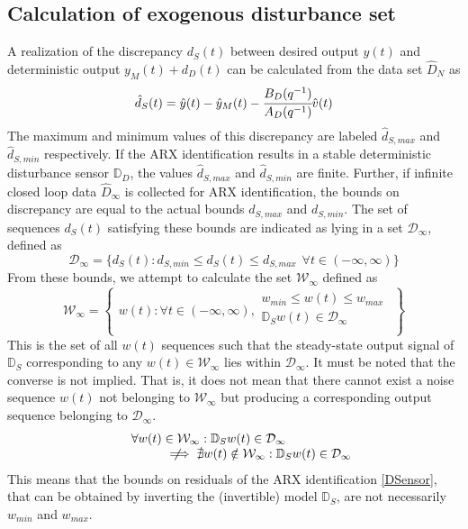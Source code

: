 \documentclass[letterpaper, 10 pt, conference]{ieeeconf}  %
\newcommand{\notimplies}{%
	\mathrel{{\ooalign{\hidewidth$\not\phantom{=}$\hidewidth\cr$\implies$}}}}
\begin{document}
	\subsection{Calculation of exogenous disturbance set}
	\label{Noise}
	A realization of the discrepancy $d_S(t)$ between desired output $y(t)$ and deterministic output $y_M(t)+d_D(t)$ can be calculated from the data set $\hat{D}_{N}$ as 
	\begin{equation*}
	\hat{d}_S(t) = \hat{y}(t)-\hat{y}_M(t)-\cfrac{B_D(q^{-1})}{A_D(q^{-1})} \hat{v}(t) 
	\end{equation*}
	The maximum and minimum values of this discrepancy are labeled $\hat{d}_{S,max}$ and $\hat{d}_{S,min}$ respectively. If the ARX identification results in a stable deterministic disturbance sensor $\mathbb{D}_D$, the values $\hat{d}_{S,max}$ and $\hat{d}_{S,min}$ are finite. Further, if infinite closed loop data $\hat{D}_{\infty}$ is collected for ARX identification, the bounds on discrepancy are equal to the actual bounds $d_{S,max}$ and $d_{S,min}$. The set of sequences $d_S(t)$ satisfying these bounds are indicated as lying in a set $\mathcal{D}_{\infty}$, defined as 
	\begin{equation*}
	\mathcal{D}_{\infty} = \{d_S(t): d_{S,min} \leq d_S(t) \leq d_{S,max} \hspace{5pt} \forall t \in (-\infty,\infty) \}
	\end{equation*}
	 From these bounds, we attempt to calculate the set $\mathcal{W}_{\infty}$ defined as
	\begin{equation*}
	\mathcal{W}_{\infty} = \begin{Bmatrix} w(t): \forall t \in (-\infty,\infty), \begin{matrix}
	w_{min}\leq w(t)\leq w_{max} \\ 
	\mathbb{D}_S w(t) \in \mathcal{D}_{\infty} \\
	\end{matrix} 
	\end{Bmatrix}
	\end{equation*}  
	This is the set of all $w(t)$ sequences such that the steady-state output signal of $\mathbb{D}_S$ corresponding to any $w(t)\in \mathcal{W}_{\infty}$  lies within $\mathcal{D}_{\infty}$. It must be noted that the converse is not implied. That is, it does not mean that there cannot exist a noise sequence $w(t)$ not belonging to $\mathcal{W}_{\infty}$ but producing a corresponding output sequence belonging to $\mathcal{D}_{\infty}$.
	\begin{equation*}
	\begin{matrix}
	\hspace{-40pt}\forall w(t) \in \mathcal{W}_{\infty}  : \mathbb{D}_S w(t) \in \mathcal{D}_{\infty} \\
	\hspace{40pt}\notimplies \nexists  w(t) \notin \mathcal{W}_{\infty} : \mathbb{D}_S w(t) \in \mathcal{D}_{\infty}
	\end{matrix}
	\end{equation*}
	This means that the bounds on residuals of the ARX identification \eqref{DSensor}, that can be obtained by inverting the (invertible) model $\mathbb{D}_S$, are not necessarily $w_{min}$ and $w_{max}$. 
		
\end{document}

